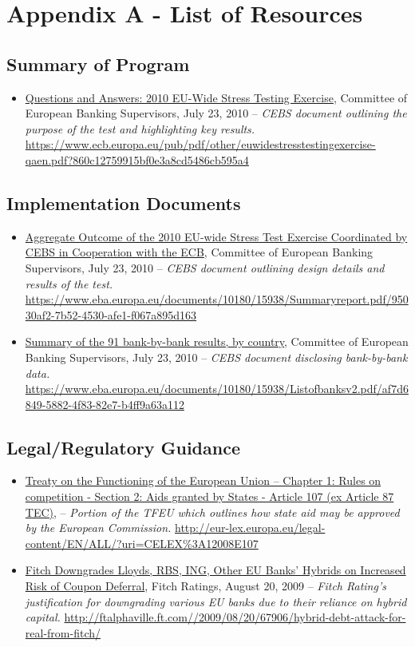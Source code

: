 \documentclass[12pt]{article}
\begin{document}
\newpage


\section{Appendix A - List of Resources}

\subsection{Summary of Program}

\begin{itemize}
\item
\ul{Questions and Answers: 2010 EU-Wide Stress Testing Exercise}, Committee of European Banking Supervisors, July 23, 2010 -- \emph{CEBS
 document outlining the purpose of the test and highlighting key results.} \url{https://www.ecb.europa.eu/pub/pdf/other/euwidestresstestingexercise-qaen.pdf?860c12759915bf0e3a8cd5486cb595a4}
\end{itemize}

\subsection{Implementation Documents}
\begin{itemize}
\item
\ul{Aggregate Outcome of the 2010 EU-wide Stress Test Exercise Coordinated by CEBS in Cooperation with the ECB}, Committee of European Banking Supervisors, July 23, 2010 -- \emph{CEBS
 document outlining design details and results of the test.} \url{https://www.eba.europa.eu/documents/10180/15938/Summaryreport.pdf/95030af2-7b52-4530-afe1-f067a895d163}
\item
\ul{Summary of the 91 bank-by-bank results, by country}, Committee of European Banking Supervisors, July 23, 2010 -- \emph{CEBS
 document disclosing bank-by-bank data.} \url{https://www.eba.europa.eu/documents/10180/15938/Listofbanksv2.pdf/af7d6849-5882-4f83-82e7-b4ff9a63a112}
\end{itemize}

\subsection{Legal/Regulatory Guidance}

\begin{itemize}
\item
\ul{Treaty on the Functioning of the European Union -- Chapter 1: Rules on competition - Section 2: Aids granted by States - Article 107 (ex Article 87 TEC)}, -- \emph{Portion of the TFEU which outlines how state aid may be approved by the European Commission.} \url{http://eur-lex.europa.eu/legal-content/EN/ALL/?uri=CELEX\%3A12008E107}
\item
\ul{Fitch Downgrades Lloyds, RBS, ING, Other EU Banks' Hybrids on Increased Risk of Coupon Deferral}, Fitch Ratings, August 20, 2009 -- \emph{Fitch Rating's justification for downgrading various EU banks due to their reliance on hybrid capital.} \url{http://ftalphaville.ft.com//2009/08/20/67906/hybrid-debt-attack-for-real-from-fitch/}
\end{itemize}
\end{document}
